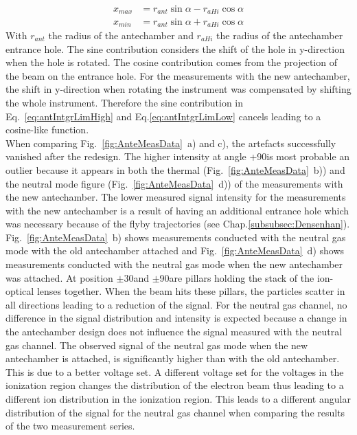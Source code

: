 	\begin{align}
		x_{max} &= r_{ant}\sin{\alpha} - r_{aHi}\cos{\alpha}\label{eq:antIntgrLimHigh}\\
		x_{min} &= r_{ant}\sin{\alpha} + r_{aHi}\cos{\alpha}\label{eq:antIntgrLimLow}
	\end{align}
	With $r_{ant}$ the radius of the antechamber and $r_{aHi}$ the radius of the antechamber entrance hole. The sine contribution considers the shift of the hole in y-direction when the hole is rotated. The cosine contribution comes from the projection of the beam on the entrance hole. For the measurements with the new antechamber, the shift in y-direction when rotating the instrument was compensated by shifting the whole instrument. Therefore the sine contribution in Eq.~\eqref{eq:antIntgrLimHigh} and Eq.\eqref{eq:antIntgrLimLow} cancels leading to a cosine-like function.\\
	When comparing Fig.~\ref{fig:AnteMeasData}~a) and c), the artefacts successfully vanished after the redesign. The higher intensity at angle +90\degree is most probable an outlier because it appears in both the thermal (Fig.~\ref{fig:AnteMeasData}~b)) and the neutral mode figure (Fig.~\ref{fig:AnteMeasData}~d)) of the measurements with the new antechamber. The lower measured signal intensity for the measurements with the new antechamber is a result of having an additional entrance hole which was necessary because of the flyby trajectories (see Chap.\ref{subsubsec:Densenhan}).\\
	Fig.~\ref{fig:AnteMeasData}~b) shows measurements conducted with the neutral gas mode with the old antechamber attached and Fig.~\ref{fig:AnteMeasData}~d) shows measurements conducted with the neutral gas mode when the new antechamber was attached. At position $\pm$30\degree and $\pm$90\degree are pillars holding the stack of the ion-optical lenses together. When the beam hits these pillars, the particles scatter in all directions leading to a reduction of the signal. For the neutral gas channel, no difference in the signal distribution and intensity is expected because a change in the antechamber design does not influence the signal measured with the neutral gas channel. The observed signal of the neutral gas mode when the new antechamber is attached, is significantly higher than with the old antechamber. This is due to a better voltage set. A different voltage set for the voltages in the ionization region changes the distribution of the electron beam thus leading to a different ion distribution in the ionization region. This leads to a different angular distribution of the signal for the neutral gas channel when comparing the results of the two measurement series. 
	
